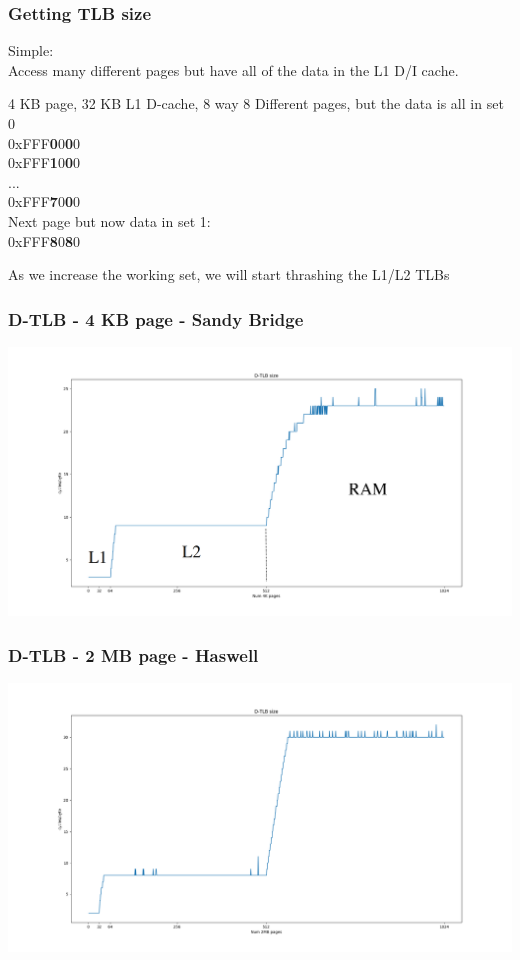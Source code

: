 \documentclass{beamer}
\begin{document}
\begin{frame}
\frametitle{Getting TLB size}
Simple:\\
Access many different pages but have all of the data in the L1 D/I cache.
\begin{block}{4 KB page, 32 KB L1 D-cache, 8 way}
8 Different pages, but the data is all in set 0\\
0xFFF\textbf{0}0\textbf{0}0\\
0xFFF\textbf{1}0\textbf{0}0\\
...\\
0xFFF\textbf{7}0\textbf{0}0\\
Next page but now data in set 1:\\
0xFFF\textbf{8}0\textbf{8}0\\
\end{block}
As we increase the working set, we will start thrashing the L1/L2 TLBs
\end{frame}

\begin{frame}
\frametitle{D-TLB - 4 KB page - Sandy Bridge}
\includegraphics[scale=.18]{img/dtlb_size.png}
\end{frame}

\begin{frame}
\frametitle{D-TLB - 2 MB page - Haswell}
\includegraphics[scale=.24]{img/dtlb_2mb_size.png}
\end{frame}
\end{document}

